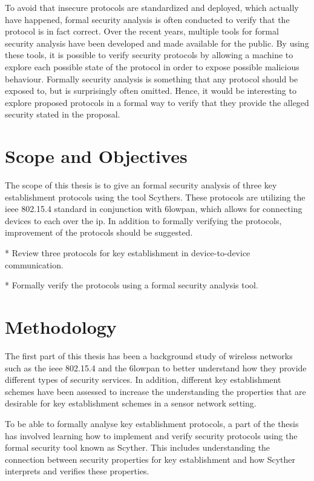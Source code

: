 To avoid that insecure protocols are standardized and deployed, which actually have happened, formal security analysis is often conducted to verify that the protocol is in fact correct. Over the recent years, multiple tools for formal security analysis have been developed and made available for the public. By using these tools, it is possible to verify security protocols by allowing a machine to explore each possible state of the protocol in order to expose possible malicious behaviour. Formally security analysis is something that any protocol should be exposed to, but is surprisingly often omitted. Hence, it would be interesting to explore proposed protocols in a formal way to verify that they provide the alleged security stated in the proposal.

\section{Scope and Objectives}

The scope of this thesis is to give an formal security analysis of three key establishment protocols using the tool Scythers. These protocols are utilizing the \gls{ieee} 802.15.4 standard in conjunction with \gls{6lowpan}, which allows for connecting devices to each over the \gls{ip}. In addition to formally verifying the protocols, improvement of the protocols should be suggested. 

* Review three protocols for key establishment in device-to-device communication.

* Formally verify the protocols using a formal security analysis tool.

\section{Methodology}

The first part of this thesis has been a background study of wireless networks such as the \gls{ieee} 802.15.4 and the \gls{6lowpan} to better understand how they provide different types of security services. In addition, different key establishment schemes have been assessed to increase the understanding the properties that are desirable for key establishment schemes in a sensor network setting.

To be able to formally analyse key establishment protocols, a part of the thesis has involved learning how to implement and verify security protocols using the formal security tool known as Scyther. This includes understanding the connection between security properties for key establishment and how Scyther interprets and verifies these properties.

